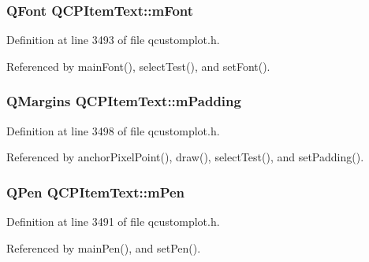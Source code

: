 \subsubsection[{m\+Font}]{\setlength{\rightskip}{0pt plus 5cm}Q\+Font Q\+C\+P\+Item\+Text\+::m\+Font\hspace{0.3cm}{\ttfamily [protected]}}\label{class_q_c_p_item_text_a1dc87fe2a824820d549ffd7e644eef8d}


Definition at line 3493 of file qcustomplot.\+h.



Referenced by main\+Font(), select\+Test(), and set\+Font().

\hypertarget{class_q_c_p_item_text_ae7b3ef0ce6046efd4b346d28f2e1fb67}{}
\subsubsection[{m\+Padding}]{\setlength{\rightskip}{0pt plus 5cm}Q\+Margins Q\+C\+P\+Item\+Text\+::m\+Padding\hspace{0.3cm}{\ttfamily [protected]}}\label{class_q_c_p_item_text_ae7b3ef0ce6046efd4b346d28f2e1fb67}


Definition at line 3498 of file qcustomplot.\+h.



Referenced by anchor\+Pixel\+Point(), draw(), select\+Test(), and set\+Padding().

\hypertarget{class_q_c_p_item_text_aa02388705dbbff1bf7b8aa872b5f579c}{}
\subsubsection[{m\+Pen}]{\setlength{\rightskip}{0pt plus 5cm}Q\+Pen Q\+C\+P\+Item\+Text\+::m\+Pen\hspace{0.3cm}{\ttfamily [protected]}}\label{class_q_c_p_item_text_aa02388705dbbff1bf7b8aa872b5f579c}


Definition at line 3491 of file qcustomplot.\+h.



Referenced by main\+Pen(), and set\+Pen().

\hypertarget{class_q_c_p_item_text_a6c27f7dc1a962a04b32430cf99f04654}{}
